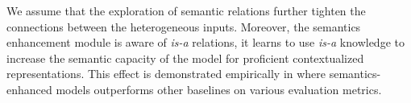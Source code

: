 %


We assume that the exploration of semantic relations further tighten the connections between 
the heterogeneous inputs.
Moreover, the semantics enhancement module is aware of \emph{is-a} relations,
it learns to use \emph{is-a} knowledge to increase the semantic capacity of the model 
for proficient contextualized representations.
This effect is demonstrated empirically in  where
semantics-enhanced models outperforms other baselines on various evaluation metrics.


